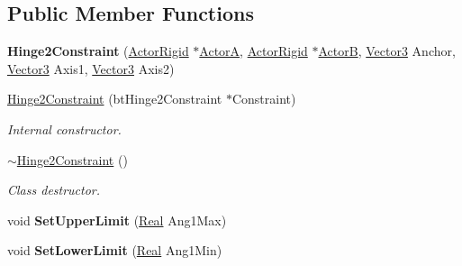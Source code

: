 \subsection*{Public Member Functions}
\begin{DoxyCompactItemize}
\item 
\hypertarget{classphys_1_1Hinge2Constraint_a3cc11d107f00c966f7e2c14713ea4e99}{
{\bfseries Hinge2Constraint} (\hyperlink{classphys_1_1ActorRigid}{ActorRigid} $\ast$\hyperlink{classphys_1_1TypedConstraint_a0fefb80c80d433bec9942b851b2f5a8a}{ActorA}, \hyperlink{classphys_1_1ActorRigid}{ActorRigid} $\ast$\hyperlink{classphys_1_1TypedConstraint_a04d2c49698d9a161e92112dd1efc1dcd}{ActorB}, \hyperlink{classphys_1_1Vector3}{Vector3} Anchor, \hyperlink{classphys_1_1Vector3}{Vector3} Axis1, \hyperlink{classphys_1_1Vector3}{Vector3} Axis2)}
\label{d2/d16/classphys_1_1Hinge2Constraint_a3cc11d107f00c966f7e2c14713ea4e99}

\item 
\hyperlink{classphys_1_1Hinge2Constraint_aaf937ddb299b8b47e243e83dfd585e44}{Hinge2Constraint} (btHinge2Constraint $\ast$Constraint)
\begin{DoxyCompactList}\small\item\em Internal constructor. \item\end{DoxyCompactList}\item 
\hyperlink{classphys_1_1Hinge2Constraint_a8e3f1210140b8205e20e4a07a3e63195}{$\sim$Hinge2Constraint} ()
\begin{DoxyCompactList}\small\item\em Class destructor. \item\end{DoxyCompactList}\item 
\hypertarget{classphys_1_1Hinge2Constraint_a0510219dca0c79d643411bd1183c5caf}{
void {\bfseries SetUpperLimit} (\hyperlink{namespacephys_af7eb897198d265b8e868f45240230d5f}{Real} Ang1Max)}
\label{d2/d16/classphys_1_1Hinge2Constraint_a0510219dca0c79d643411bd1183c5caf}

\item 
\hypertarget{classphys_1_1Hinge2Constraint_afce03aaa6e238c52027b9ab0e69304b0}{
void {\bfseries SetLowerLimit} (\hyperlink{namespacephys_af7eb897198d265b8e868f45240230d5f}{Real} Ang1Min)}
\label{d2/d16/classphys_1_1Hinge2Constraint_afce03aaa6e238c52027b9ab0e69304b0}

\end{DoxyCompactItemize}
